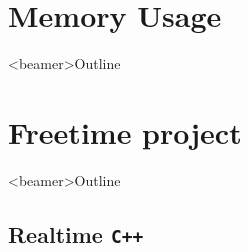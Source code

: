 \documentclass[10pt,aspectratio=169]{beamer}
\begin{document}
\section[Memory Usage]{Memory Usage}

\begin{frame}<beamer>{Outline}
\end{frame}

%
%
%
%


\section[Freetime]{Freetime project}
\begin{frame}<beamer>{Outline}
\end{frame}

\subsection[RTCPP]{Realtime \texttt{C++}}
\end{document}
